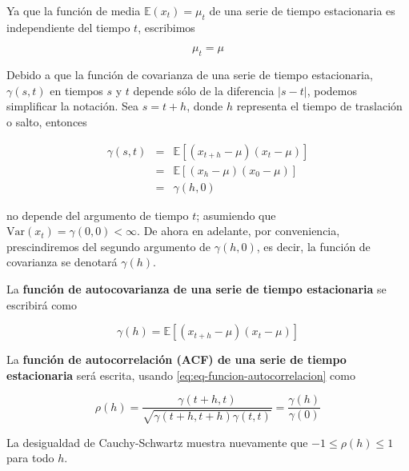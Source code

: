 \documentclass[12pt,]{krantz}
\theoremstyle{definition}
\theoremstyle{definition}
\theoremstyle{definition}
\theoremstyle{remark}
\let\BeginKnitrBlock\begin \let\EndKnitrBlock\end
\begin{document}
Ya que la función de media \(\mathbb{E}(x_t)=\mu_t\) de una serie de
tiempo estacionaria es independiente del tiempo \(t\), escribimos

\begin{equation}
\mu_t=\mu
\label{eq:e1p22}
\end{equation}

Debido a que la función de covarianza de una serie de tiempo
estacionaria, \(\gamma(s,t)\) en tiempos \(s\) y \(t\) depende sólo de
la diferencia \(|s-t|\), podemos simplificar la notación. Sea \(s=t+h\),
donde \(h\) representa el tiempo de traslación o salto, entonces

\begin{eqnarray}
\gamma(s,t)&=&\mathbb{E}[(x_{t+h}-\mu)(x_t-\mu)]\\ \nonumber
    &=&\mathbb{E}[(x_h-\mu)(x_0-\mu)]\\
    &=&\gamma(h,0) \nonumber
    \label{eq:eq-funcion-covarianza-estacionaria}
\end{eqnarray}

no depende del argumento de tiempo \(t\); asumiendo que
\(\text{Var}(x_t)=\gamma(0,0)<\infty\). De ahora en adelante, por
conveniencia, prescindiremos del segundo argumento de \(\gamma(h,0)\),
es decir, la función de covarianza se denotará \(\gamma(h)\).

\BeginKnitrBlock{definition}
\protect\hypertarget{def:defi-autocovarianza-serie-estacionaria}{}{\label{def:defi-autocovarianza-serie-estacionaria}
}La \textbf{función de autocovarianza de una serie de tiempo
estacionaria} se escribirá como

\begin{equation}
\gamma(h)=\mathbb{E}[(x_{t+h}-\mu)(x_t-\mu)]
\label{eq:eq-funcion-autocovarianza-estacionaria}
\end{equation}
\EndKnitrBlock{definition}

\BeginKnitrBlock{definition}
\protect\hypertarget{def:defi-acf-estacionaria}{}{\label{def:defi-acf-estacionaria}
}La \textbf{función de autocorrelación (ACF) de una serie de tiempo
estacionaria} será escrita, usando \eqref{eq:eq-funcion-autocorrelacion}
como

\begin{equation}
\rho(h)=\frac{\gamma(t+h,t)}{\sqrt{\gamma(t+h,t+h)\gamma(t,t)}}=\frac{\gamma(h)}{\gamma(0)}
\label{eq:eq-funcion-autocorrelacion-estacionaria}
\end{equation}
\EndKnitrBlock{definition}

La desigualdad de Cauchy-Schwartz muestra nuevamente que
\(-1\leq\rho(h)\leq1\) para todo \(h\).
\end{document}
